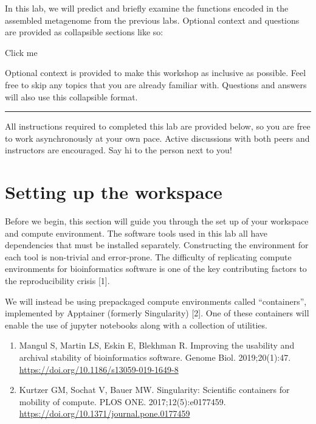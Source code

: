 \documentclass[
]{book}
\providecommand{\tightlist}{%
  \setlength{\itemsep}{0pt}\setlength{\parskip}{0pt}}
\begin{document}
In this lab, we will predict and briefly examine the functions encoded in the assembled metagenome from the previous labs.
Optional context and questions are provided as collapsible sections like so:

Click me

Optional context is provided to make this workshop as inclusive as possible. Feel free to skip
any topics that you are already familiar with. Questions and answers will also use this collapsible format.

\begin{center}\rule{0.5\linewidth}{0.5pt}\end{center}

All instructions required to completed this lab are provided below, so you are free to work asynchronously at your own pace.
Active discussions with both peers and instructors are encouraged. Say hi to the person next to you!

\section{Setting up the workspace}\label{setting-up-the-workspace}

Before we begin, this section will guide you through the set up of your workspace and compute environment.
The software tools used in this lab all have dependencies that must be installed separately.
Constructing the environment for each tool is non-trivial and error-prone.
The difficulty of replicating compute environments for bioinformatics software is one of the key contributing factors
to the reproducibility crisis {[}1{]}.

We will instead be using prepackaged compute environments called ``containers'', implemented by Apptainer (formerly Singularity) {[}2{]}.
One of these containers will enable the use of jupyter notebooks along with a collection of utilities.

\begin{enumerate}
\def\labelenumi{\arabic{enumi}.}
\tightlist
\item
  Mangul S, Martin LS, Eskin E, Blekhman R. Improving the usability and archival stability of bioinformatics software. Genome Biol. 2019;20(1):47. \url{https://doi.org/10.1186/s13059-019-1649-8}
\item
  Kurtzer GM, Sochat V, Bauer MW. Singularity: Scientific containers for mobility of compute. PLOS ONE. 2017;12(5):e0177459. \url{https://doi.org/10.1371/journal.pone.0177459}
\end{enumerate}
\end{document}
